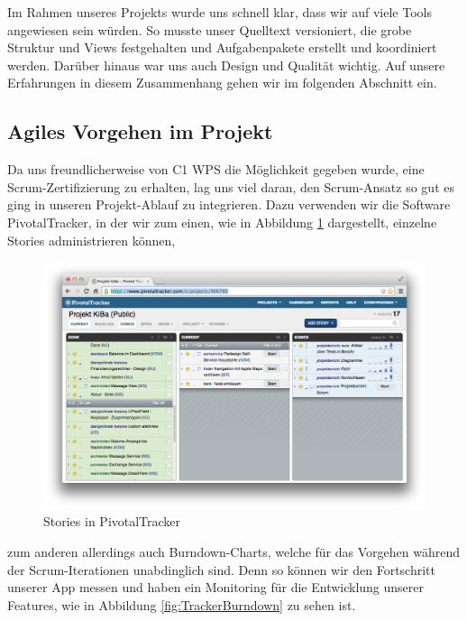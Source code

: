 Im Rahmen unseres Projekts wurde uns schnell klar, dass wir auf viele Tools angewiesen sein würden. So musste unser Quelltext versioniert, die grobe Struktur und Views festgehalten und Aufgabenpakete erstellt und koordiniert werden. Darüber hinaus war uns auch Design und Qualität wichtig. Auf unsere Erfahrungen in diesem Zusammenhang gehen wir im folgenden Abschnitt ein.

\subsection{Agiles Vorgehen im Projekt}
	Da uns freundlicherweise von C1 WPS die Möglichkeit gegeben wurde, eine Scrum-Zertifizierung zu erhalten, lag uns viel daran, den Scrum-Ansatz so gut es ging in unseren Projekt-Ablauf zu integrieren. Dazu verwenden wir die Software PivotalTracker, in der wir zum einen, wie in Abbildung \ref{fig:TrackerStories} dargestellt, einzelne Stories administrieren können,
\begin{figure}[h!]
	\centering
	\includegraphics[scale=.3]{Pictures/TrackerStories}
	\vspace{-.8cm}
	\caption{Stories in PivotalTracker\label{fig:TrackerStories}}
\end{figure}
zum anderen allerdings auch Burndown-Charts, welche für das Vorgehen während der Scrum-Iterationen unabdinglich sind. Denn so können wir den Fortschritt unserer App messen und haben ein Monitoring für die Entwicklung unserer Features, wie in Abbildung \ref{fig:TrackerBurndown} zu sehen ist.

